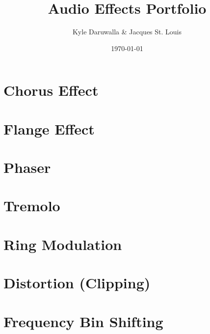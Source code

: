 \documentclass{article}
\title{Audio Effects Portfolio}
\author{Kyle Daruwalla \& Jacques St. Louis}
\date{\today}
\begin{document}
\maketitle

\section{Chorus Effect}


\section{Flange Effect}


\section{Phaser}


\section{Tremolo}


\section{Ring Modulation}


\section{Distortion (Clipping)}


\section{Frequency Bin Shifting}

\end{document}
